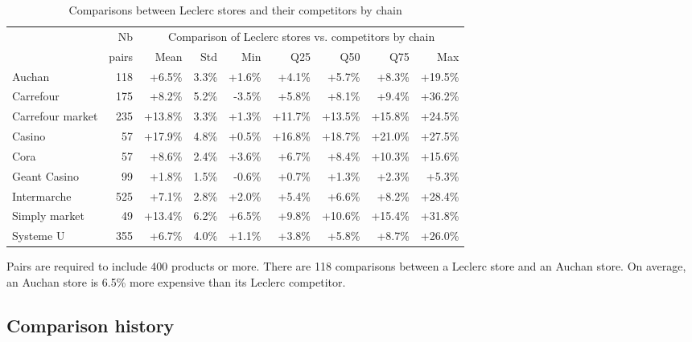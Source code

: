\documentclass[english]{article}
\begin{document}
\begin{table}[H]
\caption{Comparisons between Leclerc stores and their competitors by chain}
\label{tab:qlmc_store_comparisons}
\begin{threeparttable}
\renewcommand{\arraystretch}{0.7}%
\small
\begin{tabular}{lr|rrrrrrr}
\toprule
\toprule
          & Nb    & \multicolumn{7}{c}{Comparison of Leclerc stores vs. competitors by chain} \\
          & pairs & Mean  & Std   & Min   & Q25  & Q50 & Q75  & Max \\
\midrule
    Auchan & 118   & +6.5\% & 3.3\% & +1.6\% & +4.1\% & +5.7\% & +8.3\% & +19.5\% \\
    Carrefour & 175   & +8.2\% & 5.2\% & -3.5\% & +5.8\% & +8.1\% & +9.4\% & +36.2\% \\
    Carrefour market & 235   & +13.8\% & 3.3\% & +1.3\% & +11.7\% & +13.5\% & +15.8\% & +24.5\% \\
    Casino & 57    & +17.9\% & 4.8\% & +0.5\% & +16.8\% & +18.7\% & +21.0\% & +27.5\% \\
    Cora  & 57    & +8.6\% & 2.4\% & +3.6\% & +6.7\% & +8.4\% & +10.3\% & +15.6\% \\
    Geant Casino & 99    & +1.8\% & 1.5\% & -0.6\% & +0.7\% & +1.3\% & +2.3\% & +5.3\% \\
    Intermarche & 525   & +7.1\% & 2.8\% & +2.0\% & +5.4\% & +6.6\% & +8.2\% & +28.4\% \\
    Simply market & 49    & +13.4\% & 6.2\% & +6.5\% & +9.8\% & +10.6\% & +15.4\% & +31.8\% \\
    Systeme U & 355   & +6.7\% & 4.0\% & +1.1\% & +3.8\% & +5.8\% & +8.7\% & +26.0\% \\
\bottomrule
\bottomrule
\end{tabular}
\begin{tablenotes}
      \small
      \item Pairs are required to include 400 products or more. There are 118 comparisons between a Leclerc store and an Auchan store. On average, an Auchan store is 6.5\% more expensive than its Leclerc competitor.
\end{tablenotes}
\end{threeparttable}
\end{table}

\subsection{Comparison history}
\end{document}
